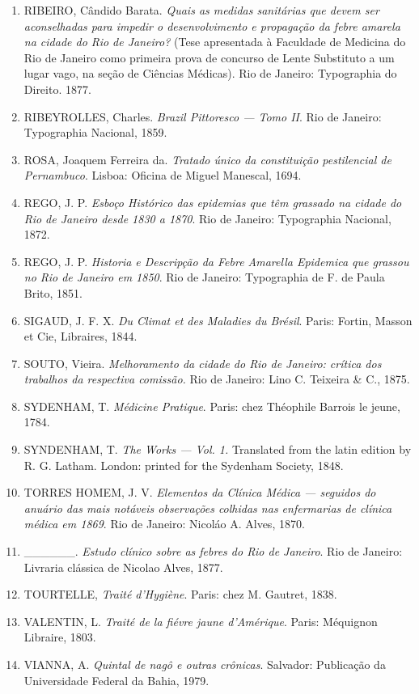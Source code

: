 \begin{enumerate}
\item
  RIBEIRO, Cândido Barata. \textit{Quais as medidas sanitárias que devem
  ser aconselhadas para impedir o desenvolvimento e propagação da febre
  amarela na cidade do Rio de Janeiro?} (Tese apresentada à Faculdade de
  Medicina do Rio de Janeiro como primeira prova de concurso de Lente
  Substituto a um lugar vago, na seção de Ciências Médicas). Rio de
  Janeiro: Typographia do Direito. 1877.
\item
  RIBEYROLLES, Charles. \textit{Brazil Pittoresco --- Tomo II}. Rio de
  Janeiro: Typographia Nacional, 1859.
\item
  ROSA, Joaquem Ferreira da. \textit{Tratado único da constituição
  pestilencial de Pernambuco}. Lisboa: Oficina de Miguel Manescal, 1694.
\item
  REGO, J. P. \textit{Esboço Histórico das epidemias que têm grassado na
  cidade do Rio de Janeiro desde 1830 a 1870}. Rio de Janeiro:
  Typographia Nacional, 1872.
\item
  REGO, J. P. \textit{Historia e Descripção da Febre Amarella Epidemica
  que grassou no Rio de Janeiro em 1850}. Rio de Janeiro: Typographia de
  F. de Paula Brito, 1851.
\item
  SIGAUD, J. F. X. \textit{Du Climat et des Maladies du Brésil}. Paris:
  Fortin, Masson et Cie, Libraires, 1844.
\item
  SOUTO, Vieira. \textit{Melhoramento da cidade do Rio de Janeiro: crítica
  dos trabalhos da respectiva comissão.} Rio de Janeiro: Lino C.
  Teixeira \& C., 1875.
\item
  SYDENHAM, T. \textit{Médicine Pratique}. Paris: chez Théophile Barrois
  le jeune, 1784.
\item
  SYNDENHAM, T. \textit{The Works --- Vol. 1.} Translated from the latin
  edition by R. G. Latham. London: printed for the Sydenham Society,
  1848.
\item
  TORRES HOMEM, J. V. \textit{Elementos da Clínica Médica --- seguidos do
  anuário das mais notáveis observações colhidas nas enfermarias de
  clínica médica em 1869}. Rio de Janeiro: Nicoláo A. Alves, 1870.
\item
  \_\_\_\_\_\_. \textit{Estudo clínico sobre as febres do Rio de Janeiro}.
  Rio de Janeiro: Livraria clássica de Nicolao Alves, 1877.
\item
  TOURTELLE, \textit{Traité d'Hygiène}. Paris: chez M. Gautret, 1838.
\item
  VALENTIN, L. \textit{Traité de la fiévre jaune d'Amérique}. Paris:
  Méquignon Libraire, 1803.
\item
  VIANNA, A. \textit{Quintal de nagô e outras crônicas}. Salvador:
  Publicação da Universidade Federal da Bahia, 1979.
\end{enumerate}

